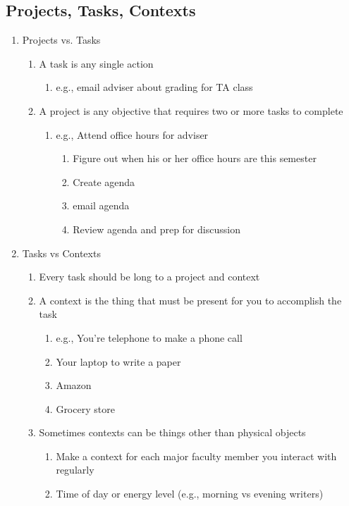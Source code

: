 \documentclass[11pt]{article}
\begin{document}
\subsection{Projects, Tasks, Contexts}
\label{sec-5-1}
\begin{enumerate}
\item Projects vs. Tasks
\label{sec-5-1-1}
\begin{enumerate}
\item A task is any single action
\begin{enumerate}
\item e.g., email adviser about grading for TA class
\end{enumerate}
\item A project is any objective that requires two or more tasks to complete
\begin{enumerate}
\item e.g., Attend office hours for adviser
\begin{enumerate}
\item Figure out when his or her office hours are this semester
\item Create agenda
\item email agenda
\item Review agenda and prep for discussion
\end{enumerate}
\end{enumerate}
\end{enumerate}
\item Tasks vs Contexts
\label{sec-5-1-2}
\begin{enumerate}
\item Every task should be long to a project and context
\item A context is the thing that must be present for you to accomplish
the task
\begin{enumerate}
\item e.g., You're telephone to make a phone call
\item Your laptop to write a paper
\item Amazon
\item Grocery store
\end{enumerate}
\item Sometimes contexts can be things other than physical objects
\begin{enumerate}
\item Make a context for each major faculty member you interact with regularly
\item Time of day or energy level (e.g., morning vs evening writers)
\end{enumerate}
\end{enumerate}
\end{enumerate}
\end{document}
